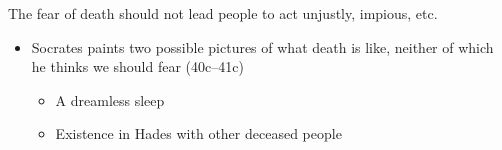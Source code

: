 \documentclass[11pt]{article}
\begin{document}
\noindent The fear of death should not lead people to act unjustly, impious, etc.

\begin{itemize}\item{Socrates paints two possible pictures of what death is like, neither of which he thinks we should fear (40c--41c)}\begin{itemize}\item{A dreamless sleep}\item{Existence in Hades with other deceased people}\end{itemize}\end{itemize}
\end{document}
